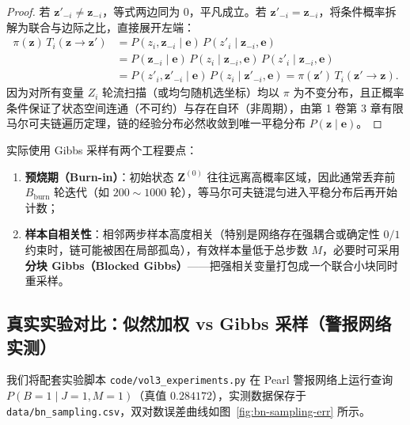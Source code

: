 \begin{proof}
若 $\mathbf{z}'_{-i} \neq \mathbf{z}_{-i}$，等式两边同为 $0$，平凡成立。若 $\mathbf{z}'_{-i} = \mathbf{z}_{-i}$，将条件概率拆解为联合与边际之比，直接展开左端：
\begin{align*}
  \pi(\mathbf{z})\, T_i(\mathbf{z} \to \mathbf{z}')
  &= P(z_i, \mathbf{z}_{-i} \mid \mathbf{e})\, P(z'_i \mid \mathbf{z}_{-i}, \mathbf{e}) \\
  &= P(\mathbf{z}_{-i} \mid \mathbf{e})\, P(z_i \mid \mathbf{z}_{-i}, \mathbf{e})\, P(z'_i \mid \mathbf{z}_{-i}, \mathbf{e}) \\
  &= P(z'_i, \mathbf{z}'_{-i} \mid \mathbf{e})\, P(z_i \mid \mathbf{z}'_{-i}, \mathbf{e})
   = \pi(\mathbf{z}')\, T_i(\mathbf{z}' \to \mathbf{z}).
\end{align*}
因为对所有变量 $Z_i$ 轮流扫描（或均匀随机选坐标）均以 $\pi$ 为不变分布，且正概率条件保证了状态空间连通（不可约）与存在自环（非周期），由第 1 卷第 3 章有限马尔可夫链遍历定理，链的经验分布必然收敛到唯一平稳分布 $P(\mathbf{z} \mid \mathbf{e})$。
\end{proof}

实际使用 Gibbs 采样有两个工程要点：
\begin{enumerate}
  \item \textbf{预烧期（Burn-in）}：初始状态 $\mathbf{Z}^{(0)}$ 往往远离高概率区域，因此通常丢弃前 $B_{\text{burn}}$ 轮迭代（如 $200\sim 1000$ 轮），等马尔可夫链混匀进入平稳分布后再开始计数；
  \item \textbf{样本自相关性}：相邻两步样本高度相关（特别是网络存在强耦合或确定性 $0/1$ 约束时，链可能被困在局部孤岛），有效样本量低于总步数 $M$，必要时可采用\textbf{分块 Gibbs（Blocked Gibbs）}——把强相关变量打包成一个联合小块同时重采样。
\end{enumerate}

\subsection{真实实验对比：似然加权 vs Gibbs 采样（警报网络实测）}

我们将配套实验脚本 \texttt{code/vol3\_experiments.py} 在 Pearl 警报网络上运行查询 $P(B=1 \mid J=1, M=1)$（真值 $0.284172$），实测数据保存于 \texttt{data/bn\_sampling.csv}，双对数误差曲线如图~\ref{fig:bn-sampling-err} 所示。

